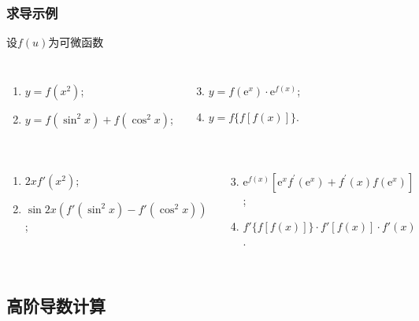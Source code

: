 \documentclass[
10pt,
aspectratio=43,
]{beamer}
\begin{document}
\begin{frame}
\begin{exampleblock}{}
\begin{columns}[onlytextwidth]
		\end{columns}
	\end{exampleblock}

\end{frame}

\begin{frame}
	\frametitle{求导示例}
	\everymath{\displaystyle}
	\begin{block}{设$f(u)$为可微函数}
		\begin{columns}[onlytextwidth]
			\begin{enumerate}
				\item $y=f\left(x^2\right)$;
				\item $y=f\left(\sin ^2 x\right)+f\left(\cos ^2 x\right)$;
			\end{enumerate}
			\begin{enumerate}
				\setcounter{enumi}{2}
				\item $y=f\left(\mathrm{e}^x\right) \cdot \mathrm{e}^{f(x)}$;
				\item $y=f\{f[f(x)]\}$.
			\end{enumerate}
		\end{columns}
	\end{block}

	\begin{exampleblock}{}
		\begin{columns}[onlytextwidth]
			\begin{enumerate}
				\pause
				\item $\displaystyle 2x f'\left(x^2\right)$;
				\pause
				\item $\displaystyle \sin 2x \left(f'\left(\sin ^2 x\right)-f'\left(\cos ^2 x\right)\right)$;
			\end{enumerate}
			\begin{enumerate}
				\setcounter{enumi}{2}
				\pause
				\item $\mathrm{e}^{f(x)}\left[\mathrm{e}^x f^{\prime}\left(\mathrm{e}^x\right)+f^{\prime}(x) f\left(\mathrm{e}^x\right)\right]$;
				\pause
				\item $\displaystyle f'\{f[f(x)]\} \cdot f'[f(x)] \cdot f'(x)$.
			\end{enumerate}
		\end{columns}
	\end{exampleblock}

\end{frame}

\subsection{高阶导数计算}
\end{document}

